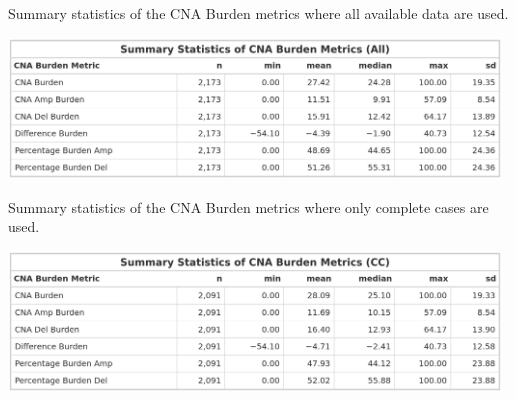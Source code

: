 \begin{table}[!htb]
\center
\caption[Summary statistics of the CNA Burden metrics where all available data are used.]{Summary statistics of the CNA Burden metrics where all available data are used.}
\includegraphics[width = 0.98\textwidth]{../tables/Chapter_2/Global_CNA_Burden_Metric_All_Summary.png}
\label{tab:Burden_All}
\end{table}

\begin{table}[!htb]
\center
\caption[Summary statistics of the CNA Burden metrics where only complete cases are used.]{Summary statistics of the CNA Burden metrics where only complete cases are used.}
\includegraphics[width = 0.98\textwidth]{../tables/Chapter_2/Global_CNA_Burden_Metric_CCA_Summary.png}
\label{tab:Burden_CCA}
\end{table}

